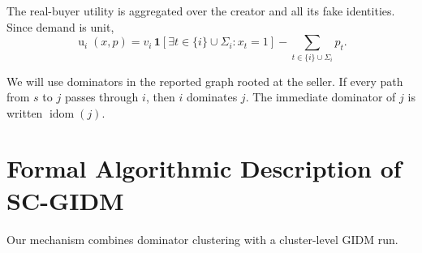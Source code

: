 \documentclass[sigconf]{aamas}
\theoremstyle{definition}
\theoremstyle{remark}
\newcommand{\util}{\operatorname{u}}
\newcommand{\idom}{\operatorname{idom}}
\newcommand{\ind}{\mathbf{1}}
\begin{document}
The real-buyer utility is aggregated over the creator and all its fake identities. Since demand is unit,
\begin{equation}
\util_i(x,p)=v_i\,\ind[\exists t\in \{i\}\cup \Sigma_i : x_t=1]-\sum_{t\in \{i\}\cup \Sigma_i}p_t .
\label{eq:realu}
\end{equation}

We will use dominators in the reported graph rooted at the seller. If every path from $s$ to $j$ passes through $i$, then $i$ dominates $j$. The immediate dominator of $j$ is written $\idom(j)$.

\section{Formal Algorithmic Description of SC-GIDM}
Our mechanism combines dominator clustering with a cluster-level GIDM run.
\end{document}

